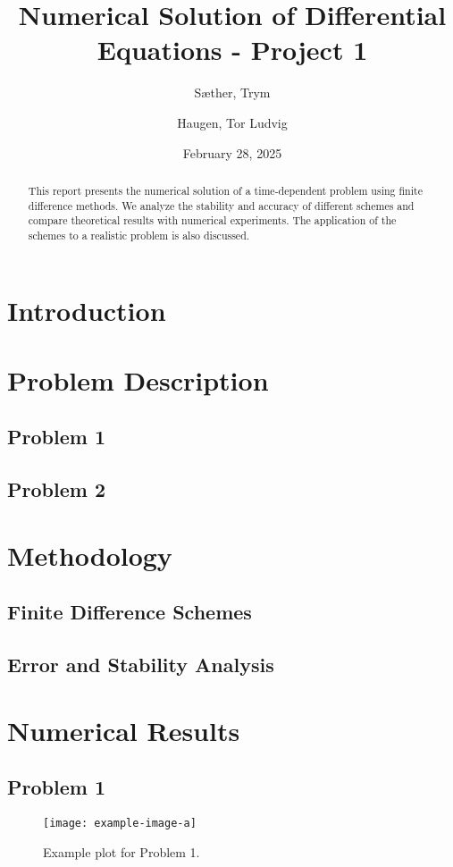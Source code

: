 \documentclass[a4paper,12pt]{report}
\title{Numerical Solution of Differential Equations - Project 1}
\author[1]{Sæther, Trym}
\author[1]{Haugen, Tor Ludvig}
\affil[1]{Department of Mathematical Sciences, NTNU}
\date{February 28, 2025}
\begin{document}
\maketitle

\begin{abstract}
This report presents the numerical solution of a time-dependent problem using finite difference methods. We analyze the stability and accuracy of different schemes and compare theoretical results with numerical experiments. The application of the schemes to a realistic problem is also discussed.
\end{abstract}

\section{Introduction}



\section{Problem Description}
\subsection{Problem 1}
\lipsum[3]

\subsection{Problem 2}
\lipsum[4]

\section{Methodology}
\subsection{Finite Difference Schemes}
\lipsum[5]

\subsection{Error and Stability Analysis}
\lipsum[6]

\section{Numerical Results}
\subsection{Problem 1}
\lipsum[7]
\begin{figure}[H]
    \centering
    \texttt{[image: example-image-a]}
    \caption{Example plot for Problem 1.}
    \label{fig:problem1}
\end{figure}
\end{document}
